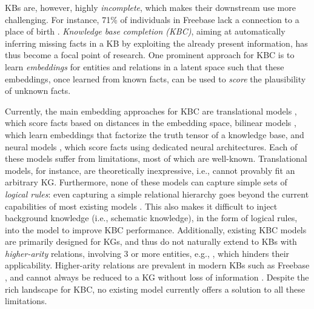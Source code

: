 \documentclass{article}
\begin{document}
KBs are, however, highly \emph{incomplete}, which makes their downstream use more challenging. For instance, 71\% of individuals in Freebase lack a connection to a place of birth \cite{WestGMSGL14}.
\emph{Knowledge base completion (KBC)}, aiming at automatically inferring missing facts in a KB by exploiting the already present information, has thus become a focal point of research.
One prominent approach for KBC is to learn \emph{embeddings} for entities and relations in a latent space such that these embeddings, once learned from known facts, can be used to \emph{score} the plausibility of unknown facts. 

Currently, the main embedding approaches for KBC are translational models \cite{TransE-NIPS13, RotatE-ICLR19}, which score facts based on distances in the embedding space, bilinear models \cite{ComplEx-ICML16, DistMult-ICLR15, TuckER},  which learn embeddings that factorize the truth tensor of a knowledge base, and neural models \cite{ConvE-AAAI18, SocherCMN13, KBGAT-ACL19},  which score facts using dedicated neural architectures. 
Each of these models suffer from limitations, most of which are well-known. 
Translational models, for instance, are theoretically inexpressive, i.e., cannot provably fit an arbitrary KG. 
Furthermore, none of these models can capture simple sets of \emph{logical rules}: even capturing a simple relational hierarchy goes beyond the current capabilities of most existing models \cite{Gutirrez18}.
This also makes it difficult to inject background knowledge (i.e., schematic knowledge), in the form of logical rules, into the model to  improve KBC performance.
Additionally, existing KBC models are primarily designed for KGs, and thus do not naturally extend to KBs with \emph{higher-arity} relations, involving 3 or more entities, e.g.,   \cite{Fatemi19}, which hinders their applicability. Higher-arity relations are prevalent in modern KBs such as Freebase \cite{Wen16}, and cannot always be reduced to a KG without loss of information \cite{Fatemi19}. 
Despite the rich landscape for KBC, no existing model currently offers a solution to all these limitations.
\end{document}
